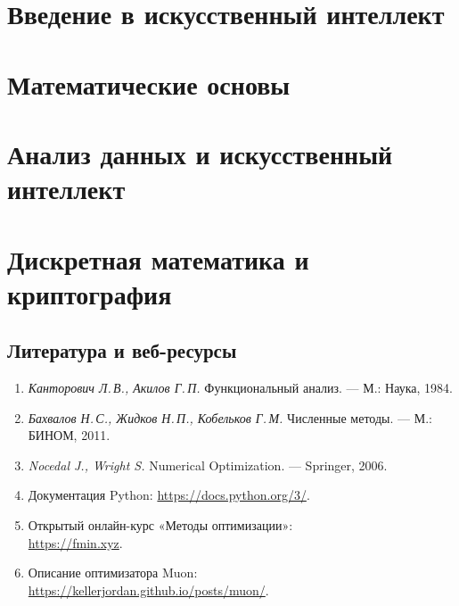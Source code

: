 \documentclass[11pt, openany, twoside]{book}
\begin{document}
\part{Введение в искусственный интеллект}


\part{Математические основы}


\part{Анализ данных и искусственный интеллект}


 \part{Дискретная математика и криптография}
 

\backmatter
\chapter*{Литература и веб-ресурсы}

\noindent\small
\begin{enumerate}\itemsep2pt
  \item \emph{Канторович Л.\,В., Акилов Г.\,П.} Функциональный анализ. ---
        М.: Наука, 1984.
  \item \emph{Бахвалов Н.\,С., Жидков Н.\,П., Кобельков Г.\,М.}
        Численные методы. --- М.: БИНОМ, 2011.
  \item \emph{Nocedal J., Wright S.} Numerical Optimization. ---
        Springer, 2006.
  \item Документация Python: \url{https://docs.python.org/3/}.
  \item Открытый онлайн-курс «Методы оптимизации»:\\
        \url{https://fmin.xyz}.
  \item Описание оптимизатора Muon:\\
        \url{https://kellerjordan.github.io/posts/muon/}.
\end{enumerate}
\end{document}
